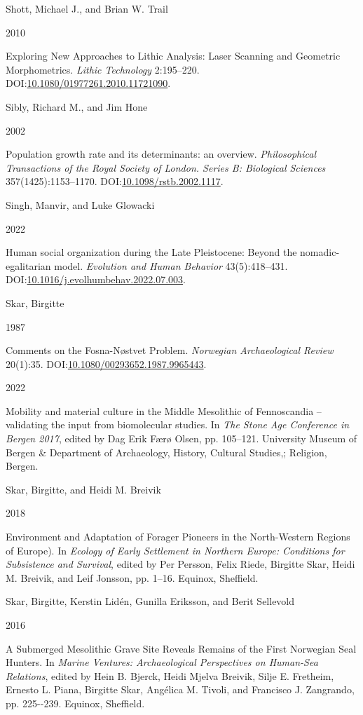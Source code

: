 \documentclass[
  12pt,
  a4paper,
  oneside]{book}
\newlength{\cslhangindent}
\newlength{\csllabelwidth}
\newlength{\cslentryspacingunit} %
\newenvironment{CSLReferences}[2] %
 {%
  \setlength{\parindent}{0pt}
  \ifodd #1
  \let\oldpar\par
  \def\par{\hangindent=\cslhangindent\oldpar}
  \fi
  \setlength{\parskip}{#2\cslentryspacingunit}
 }%
 {}
\newcommand{\CSLBlock}[1]{#1\hfill\break}
\newcommand{\CSLLeftMargin}[1]{\parbox[t]{\csllabelwidth}{#1}}
\newcommand{\CSLRightInline}[1]{\parbox[t]{\linewidth - \csllabelwidth}{#1}\break}
\begin{document}
\begin{CSLReferences}{0}{0}
\leavevmode{}%
\CSLBlock{Shott, Michael J., and Brian W. Trail}
\CSLLeftMargin{ 2010}%
\CSLRightInline{{Exploring New Approaches to Lithic Analysis: Laser Scanning and Geometric Morphometrics}. \emph{Lithic Technology} 2:195--220. DOI:\href{https://doi.org/10.1080/01977261.2010.11721090}{10.1080/01977261.2010.11721090}.}

\leavevmode{}%
\CSLBlock{Sibly, Richard M., and Jim Hone}
\CSLLeftMargin{ 2002}%
\CSLRightInline{Population growth rate and its determinants: an overview. \emph{Philosophical Transactions of the Royal Society of London. Series B: Biological Sciences} 357(1425):1153--1170. DOI:\href{https://doi.org/10.1098/rstb.2002.1117}{10.1098/rstb.2002.1117}.}

\leavevmode{}%
\CSLBlock{Singh, Manvir, and Luke Glowacki}
\CSLLeftMargin{ 2022}%
\CSLRightInline{{Human social organization during the Late Pleistocene: Beyond the nomadic-egalitarian model}. \emph{Evolution and Human Behavior} 43(5):418--431. DOI:\href{https://doi.org/10.1016/j.evolhumbehav.2022.07.003}{10.1016/j.evolhumbehav.2022.07.003}.}

\leavevmode{}%
\CSLBlock{Skar, Birgitte}
\CSLLeftMargin{ 1987}%
\CSLRightInline{{Comments on the Fosna-Nøstvet Problem}. \emph{Norwegian Archaeological Review} 20(1):35. DOI:\href{https://doi.org/10.1080/00293652.1987.9965443}{10.1080/00293652.1987.9965443}.}

\leavevmode{}%
\CSLLeftMargin{ 2022 }%
\CSLRightInline{{Mobility and material culture in the Middle Mesolithic of Fennoscandia -- validating the input from biomolecular studies}. In \emph{{The Stone Age Conference in Bergen 2017}}, edited by Dag Erik Færø Olsen, pp. 105--121. University Museum of Bergen \& Department of Archaeology, History, Cultural Studies,; Religion, Bergen.}

\leavevmode{}%
\CSLBlock{Skar, Birgitte, and Heidi M. Breivik}
\CSLLeftMargin{ 2018}%
\CSLRightInline{{Environment and Adaptation of Forager Pioneers in the North-Western Regions of Europe)}. In \emph{{Ecology of Early Settlement in Northern Europe: Conditions for Subsistence and Survival}}, edited by Per Persson, Felix Riede, Birgitte Skar, Heidi M. Breivik, and Leif Jonsson, pp. 1--16. Equinox, Sheffield.}

\leavevmode{}%
\CSLBlock{Skar, Birgitte, Kerstin Lidén, Gunilla Eriksson, and Berit Sellevold}
\CSLLeftMargin{ 2016}%
\CSLRightInline{{A Submerged Mesolithic Grave Site Reveals Remains of the First Norwegian Seal Hunters}. In \emph{{Marine Ventures: Archaeological Perspectives on Human-Sea Relations}}, edited by Hein B. Bjerck, Heidi Mjelva Breivik, Silje E. Fretheim, Ernesto L. Piana, Birgitte Skar, Angélica M. Tivoli, and Francisco J. Zangrando, pp. 225-\/-239. Equinox, Sheffield.}


\end{CSLReferences}
\end{document}
